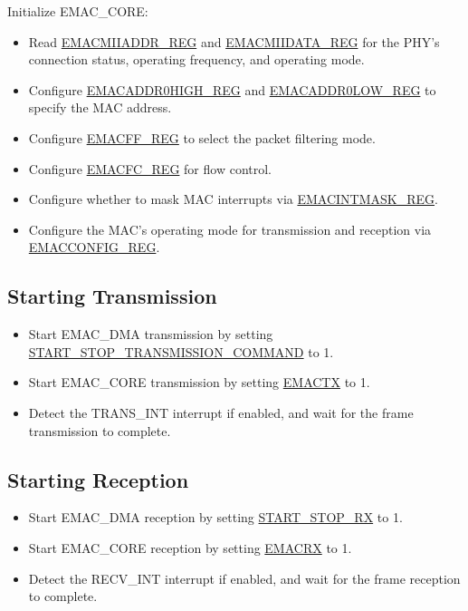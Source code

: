 \documentclass[main\_\_EN.tex]{subfiles}
\begin{document}
Initialize EMAC\_CORE:
\begin{itemize}
    \item Read \hyperref[regdesc:EMACMIIADDRREG]{EMACMIIADDR\_REG} and \hyperref[regdesc:EMACMIIDATAREG]{EMACMIIDATA\_REG} for the PHY's connection status, operating frequency, and operating mode.
    \item Configure \hyperref[regdesc:EMACADDR0HIGHREG]{EMACADDR0HIGH\_REG} and \hyperref[regdesc:EMACADDR0LOWREG]{EMACADDR0LOW\_REG} to specify the MAC address.
    \item Configure \hyperref[regdesc:EMACFFREG]{EMACFF\_REG} to select the packet filtering mode.
    \item Configure \hyperref[regdesc:EMACFLOWCONTROLREG]{EMACFC\_REG} for flow control.
    \item Configure whether to mask MAC interrupts via \hyperref[regdesc:EMACINTMASKREG]{EMACINTMASK\_REG}.
    \item Configure the MAC's operating mode for transmission and reception via \hyperref[regdesc:EMACCONFIGREG]{EMACCONFIG\_REG}.
\end{itemize}

\subsection{Starting Transmission}

\begin{itemize}
    \item Start EMAC\_DMA transmission by setting \hyperref[regdesc:DMAOPERATIONMODEREG]{START\_STOP\_TRANSMISSION\_COMMAND} to 1.
    \item Start EMAC\_CORE transmission by setting \hyperref[regdesc:EMACCONFIGREG]{EMACTX} to 1.
    \item Detect the TRANS\_INT interrupt if enabled, and wait for the frame transmission to complete.
\end{itemize}

\subsection{Starting Reception}

\begin{itemize}
    \item Start EMAC\_DMA reception by setting \hyperref[regdesc:DMAOPERATIONMODEREG]{START\_STOP\_RX} to 1.
    \item Start EMAC\_CORE reception by setting \hyperref[regdesc:EMACCONFIGREG]{EMACRX} to 1.
    \item Detect the RECV\_INT interrupt if enabled, and wait for the frame reception to complete.
\end{itemize}
\end{document}
